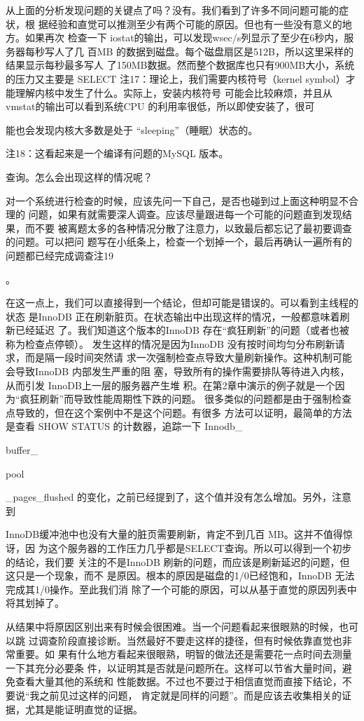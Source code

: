 {从上面的分析发现问题的关键点了吗？没有。我们看到了许多不同问题可能的症状，根
据经验和直觉可以推测至少有两个可能的原因。但也有一些没有意义的地方。如果再次
检查一下 iostat的输出，可以发现wsec/s列显示了至少在6秒内，服务器每秒写人了几
百MB 的数据到磁盘。每个磁盘扇区是512B，所以这里采样的结果显示每秒最多写人
了150MB数据。然而整个数据库也只有900MB大小，系统的压力又主要是 SELECT
注17：理论上，我们需要内核符号（kernel symbol）才能理解内核中发生了什么。实际上，安装内核符号
可能会比较麻烦，并且从 vmstat的输出可以看到系统CPU 的利用率很低，所以即使安装了，很可

能也会发现内核大多数是处于 “sleeping”（睡眠）状态的。

注18：这看起来是一个编译有问题的MySQL 版本。

查询。怎么会出现这样的情况呢？

对一个系统进行检查的时候，应该先问一下自己，是否也碰到过上面这种明显不合理的
问题，如果有就需要深人调查。应该尽量跟进每一个可能的问题直到发现结果，而不要
被离题太多的各种情况分散了注意力，以致最后都忘记了最初要调查的问题。可以把问
题写在小纸条上，检查一个划掉一个，最后再确认一遍所有的问题都已经完成调查注19

。

在这一点上，我们可以直接得到一个结论，但却可能是错误的。可以看到主线程的状态
是InnoDB 正在刷新脏页。在状态输出中出现这样的情况，一般都意味着刷新已经延迟
了。我们知道这个版本的InnoDB 存在“疯狂刷新”的问题（或者也被称为检查点停顿）。
发生这样的情况是因为InnoDB 没有按时间均匀分布刷新请求，而是隔一段时间突然请
求一次强制检查点导致大量刷新操作。这种机制可能会导致InnoDB 内部发生严重的阻
塞，导致所有的操作需要排队等待进入内核，从而引发 InnoDB上一层的服务器产生堆
积。在第2章中演示的例子就是一个因为“疯狂刷新”而导致性能周期性下跌的问题。
很多类似的问题都是由于强制检查点导致的，但在这个案例中不是这个问题。有很多
方法可以证明，最简单的方法是查看 SHOW STATUS 的计数器，追踪一下 Innodb\_

buffer\_

pool

\_pages\_flushed 的变化，之前已经提到了，这个值并没有怎么增加。另外，注意到

InnoDB缓冲池中也没有大量的脏页需要刷新，肯定不到几百 MB。这并不值得惊讶，因
为这个服务器的工作压力几乎都是SELECT查询。所以可以得到一个初步的结论，我们要
关注的不是InnoDB 刷新的问题，而应该是刷新延迟的问题，但这只是一个现象，而不
是原因。根本的原因是磁盘的1/0已经饱和，InnoDB 无法完成其1/0操作。至此我们消
除了一个可能的原因，可以从基于直觉的原因列表中将其划掉了。

从结果中将原因区别出来有时候会很困难。当一个问题看起来很眼熟的时候，也可以跳
过调查阶段直接诊断。当然最好不要走这样的捷径，但有时候依靠直觉也非常重要。如
果有什么地方看起来很眼熟，明智的做法还是需要花一点时间去测量一下其充分必要条
件，以证明其是否就是问题所在。这样可以节省大量时间，避免查看大量其他的系统和
性能数据。不过也不要过于相信直觉而直接下结论，不要说“我之前见过这样的问题，
肯定就是同样的问题”。而是应该去收集相关的证据，尤其是能证明直觉的证据。

}

